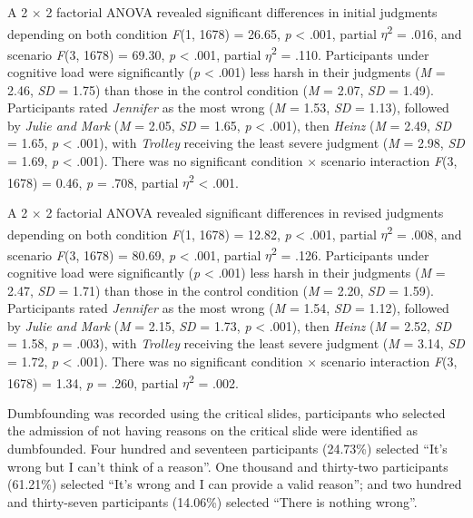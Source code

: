 \documentclass[
  american,
  man,floatsintext]{apa7}
\begin{document}
A 2 \(\times\) 2 factorial ANOVA revealed significant differences in initial judgments depending on both condition \emph{F}(1, 1678) = 26.65, \emph{p} \textless{} .001, partial \(\eta\)\textsuperscript{2} = .016, and scenario \emph{F}(3, 1678) = 69.30, \emph{p} \textless{} .001, partial \(\eta\)\textsuperscript{2} = .110. Participants under cognitive load were significantly (\emph{p} \textless{} .001) less harsh in their judgments (\emph{M} = 2.46, \emph{SD} = 1.75) than those in the control condition (\emph{M} = 2.07, \emph{SD} = 1.49). Participants rated \emph{Jennifer} as the most wrong (\emph{M} = 1.53, \emph{SD} = 1.13), followed by \emph{Julie and Mark} (\emph{M} = 2.05, \emph{SD} = 1.65, \emph{p} \textless{} .001), then \emph{Heinz} (\emph{M} = 2.49, \emph{SD} = 1.65, \emph{p} \textless{} .001), with \emph{Trolley} receiving the least severe judgment (\emph{M} = 2.98, \emph{SD} = 1.69, \emph{p} \textless{} .001). There was no significant condition \(\times\) scenario interaction \emph{F}(3, 1678) = 0.46, \emph{p} = .708, partial \(\eta\)\textsuperscript{2} \textless{} .001.

A 2 \(\times\) 2 factorial ANOVA revealed significant differences in revised judgments depending on both condition \emph{F}(1, 1678) = 12.82, \emph{p} \textless{} .001, partial \(\eta\)\textsuperscript{2} = .008, and scenario \emph{F}(3, 1678) = 80.69, \emph{p} \textless{} .001, partial \(\eta\)\textsuperscript{2} = .126. Participants under cognitive load were significantly (\emph{p} \textless{} .001) less harsh in their judgments (\emph{M} = 2.47, \emph{SD} = 1.71) than those in the control condition (\emph{M} = 2.20, \emph{SD} = 1.59). Participants rated \emph{Jennifer} as the most wrong (\emph{M} = 1.54, \emph{SD} = 1.12), followed by \emph{Julie and Mark} (\emph{M} = 2.15, \emph{SD} = 1.73, \emph{p} \textless{} .001), then \emph{Heinz} (\emph{M} = 2.52, \emph{SD} = 1.58, \emph{p} = .003), with \emph{Trolley} receiving the least severe judgment (\emph{M} = 3.14, \emph{SD} = 1.72, \emph{p} \textless{} .001). There was no significant condition \(\times\) scenario interaction \emph{F}(3, 1678) = 1.34, \emph{p} = .260, partial \(\eta\)\textsuperscript{2} = .002.

Dumbfounding was recorded using the critical slides, participants who selected the admission of not having reasons on the critical slide were identified as dumbfounded. Four hundred and seventeen participants (24.73\%) selected \enquote{It's wrong but I can't think of a reason}. One thousand and thirty-two participants (61.21\%) selected \enquote{It's wrong and I can provide a valid reason}; and two hundred and thirty-seven participants (14.06\%) selected \enquote{There is nothing wrong}.
\end{document}
